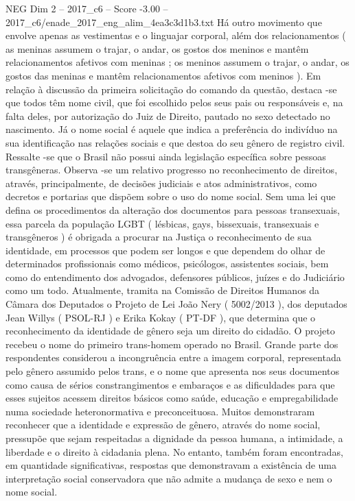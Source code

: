 \begin{textsample}{NEG Dim 2 – 2017\_c6 – Score -3.00 – 2017\_c6/enade\_2017\_eng\_alim\_4ea3c3d1b3.txt}
Há outro movimento que envolve apenas as vestimentas e o linguajar corporal, além dos relacionamentos ( as meninas assumem o trajar, o andar, os gostos dos meninos e mantêm relacionamentos afetivos com meninas ; os meninos assumem o trajar, o andar, os gostos das meninas e mantêm relacionamentos afetivos com meninos ).
Em relação à discussão da primeira solicitação do comando da questão, destaca -se que todos têm nome civil, que foi escolhido pelos seus pais ou responsáveis e, na falta deles, por autorização do Juiz de Direito, pautado no sexo detectado no nascimento.
Já o nome social é aquele que indica a preferência do indivíduo na sua identificação nas relações sociais e que destoa do seu gênero de registro civil.
Ressalte -se que o Brasil não possui ainda legislação específica sobre pessoas transgêneras.
Observa -se um relativo progresso no reconhecimento de direitos, através, principalmente, de decisões judiciais e atos administrativos, como decretos e portarias que dispõem sobre o uso do nome social.
Sem uma lei que defina os procedimentos da alteração dos documentos para pessoas transexuais, essa parcela da população LGBT ( lésbicas, gays, bissexuais, transexuais e transgêneros ) é obrigada a procurar na Justiça o reconhecimento de sua identidade, em processos que podem ser longos e que dependem do olhar de determinados profissionais como médicos, psicólogos, assistentes sociais, bem como do entendimento dos advogados, defensores públicos, juízes e do Judiciário como um todo.
Atualmente, tramita na Comissão de Direitos Humanos da Câmara dos Deputados o Projeto de Lei João Nery ( 5002/2013 ), dos deputados Jean Willys ( PSOL-RJ ) e Erika Kokay ( PT-DF ), que determina que o reconhecimento da identidade de gênero seja um direito do cidadão.
O projeto recebeu o nome do primeiro trans-homem operado no Brasil.
Grande parte dos respondentes considerou a incongruência entre a imagem corporal, representada pelo gênero assumido pelos trans, e o nome que apresenta nos seus documentos como causa de sérios constrangimentos e embaraços e as dificuldades para que esses sujeitos acessem direitos básicos como saúde, educação e empregabilidade numa sociedade heteronormativa e preconceituosa.
Muitos demonstraram reconhecer que a identidade e expressão de gênero, através do nome social, pressupõe que sejam respeitadas a dignidade da pessoa humana, a intimidade, a liberdade e o direito à cidadania plena.
No entanto, também foram encontradas, em quantidade significativas, respostas que demonstravam a existência de uma interpretação social conservadora que não admite a mudança de sexo e nem o nome social.

\end{textsample}
